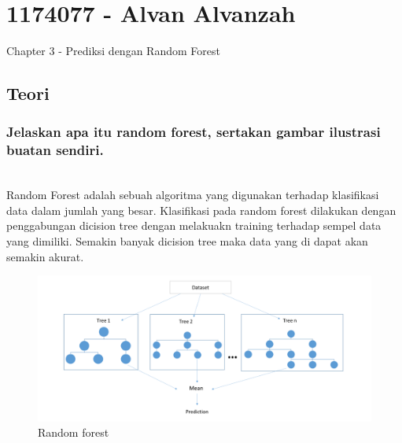\section{1174077 - Alvan Alvanzah}
Chapter 3 - Prediksi dengan Random Forest
\subsection{Teori}
\subsubsection{ Jelaskan apa itu random forest, sertakan gambar ilustrasi buatan sendiri.}
\hfill\\
Random Forest adalah sebuah algoritma yang digunakan terhadap klasifikasi data dalam jumlah yang besar. Klasifikasi pada random forest dilakukan dengan penggabungan dicision tree dengan melakuakn training terhadap sempel data yang dimiliki. Semakin banyak dicision tree maka data yang di dapat akan
semakin akurat.

\begin{figure}[H]
	\centering
	\includegraphics[width=12cm]{figures/1174077/3/1.png}
	\caption{Random forest}
\end{figure}


